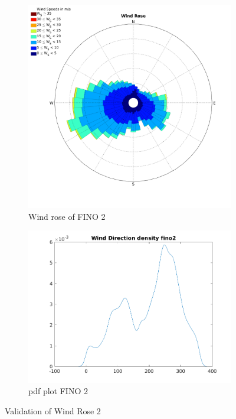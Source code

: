 \documentclass[10pt]{article}
\begin{document}
\begin{figure}[htb!]
\begin{subfigure}{0.5\textwidth}
  \centering
  \includegraphics[width=1\linewidth]{../figures/WindRose_Fino2.png}
  \caption{Wind rose of FINO 2}
\end{subfigure}
\begin{subfigure}{0.5\textwidth}
  \centering
  \includegraphics[width=1\linewidth]{../figures/Validation_WindRose_Fino2.png}
  \caption{pdf plot FINO 2}
\end{subfigure}
  \caption{Validation of Wind Rose 2}
\label{fig:WindroseValidation}
\end{figure}
\end{document}
